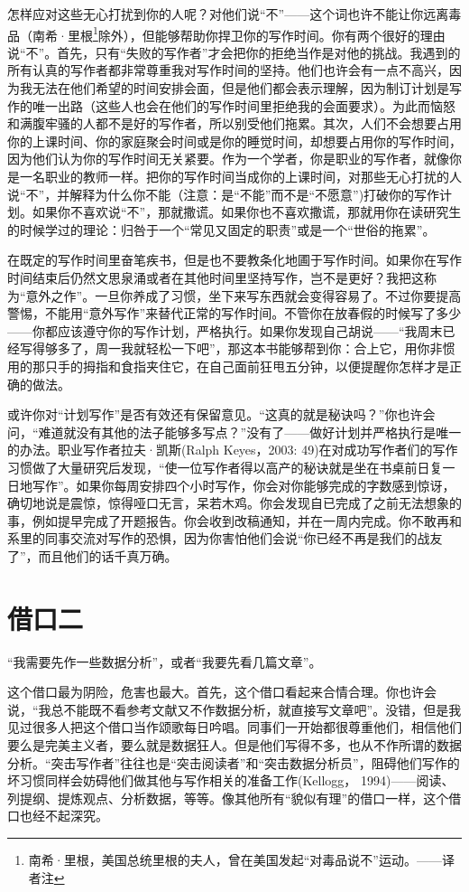 怎样应对这些无心打扰到你的人呢？对他们说“不”——这个词也许不能让你远离毒品（南希·里根\footnote{南希·里根，美国总统里根的夫人，曾在美国发起“对毒品说不”运动。——译者注}除外），但能够帮助你捍卫你的写作时间。你有两个很好的理由说“不”。首先，只有“失败的写作者”才会把你的拒绝当作是对他的挑战。我遇到的所有认真的写作者都非常尊重我对写作时间的坚持。他们也许会有一点不高兴，因为我无法在他们希望的时间安排会面，但是他们都会表示理解，因为制订计划是写作的唯一出路（这些人也会在他们的写作时间里拒绝我的会面要求）。为此而恼怒和满腹牢骚的人都不是好的写作者，所以别受他们拖累。其次，人们不会想要占用你的上课时间、你的家庭聚会时间或是你的睡觉时间，却想要占用你的写作时间，因为他们认为你的写作时间无关紧要。作为一个学者，你是职业的写作者，就像你是一名职业的教师一样。把你的写作时间当成你的上课时间，对那些无心打扰的人说“不”，并解释为什么你不能（注意：是“不能”而不是“不愿意”)打破你的写作计划。如果你不喜欢说“不”，那就撒谎。如果你也不喜欢撒谎，那就用你在读研究生的时候学过的理论：归咎于一个“常见又固定的职责”或是一个“世俗的拖累”。

在既定的写作时间里奋笔疾书，但是也不要教条化地圃于写作时间。如果你在写作时间结束后仍然文思泉涌或者在其他时间里坚持写作，岂不是更好？我把这称为“意外之作”。一旦你养成了习惯，坐下来写东西就会变得容易了。不过你要提高警惕，不能用“意外写作”来替代正常的写作时间。不管你在放春假的时候写了多少——你都应该遵守你的写作计划，严格执行。如果你发现自己胡说——“我周末已经写得够多了，周一我就轻松一下吧”，那这本书能够帮到你：合上它，用你非惯用的那只手的拇指和食指夹住它，在自己面前狂甩五分钟，以便提醒你怎样才是正确的做法。

或许你对“计划写作”是否有效还有保留意见。“这真的就是秘诀吗？”你也许会问，“难道就没有其他的法子能够多写点？”没有了——做好计划并严格执行是唯一的办法。职业写作者拉夫·凯斯(Ralph Keyes，2003: 49)在对成功写作者们的写作习惯做了大量研究后发现，“使一位写作者得以高产的秘诀就是坐在书桌前日复一日地写作”。如果你每周安排四个小时写作，你会对你能够完成的字数感到惊讶，确切地说是震惊，惊得哑口无言，呆若木鸡。你会发现自已完成了之前无法想象的事，例如提早完成了开题报告。你会收到改稿通知，并在一周内完成。你不敢再和系里的同事交流对写作的恐惧，因为你害怕他们会说“你已经不再是我们的战友了”，而且他们的话千真万确。


\section{借口二}
“我需要先作一些数据分析”，或者“我要先看几篇文章”。

这个借口最为阴险，危害也最大。首先，这个借口看起来合情合理。你也许会说，“我总不能既不看参考文献又不作数据分析，就直接写文章吧”。没错，但是我见过很多人把这个借口当作颂歌每日吟唱。同事们一开始都很尊重他们，相信他们要么是完美主义者，要么就是数据狂人。但是他们写得不多，也从不作所谓的数据分析。“突击写作者”往往也是“突击阅读者”和“突击数据分析员”，阻碍他们写作的坏习惯同样会妨碍他们做其他与写作相关的准备工作(Kellogg， 1994)——阅读、列提纲、提炼观点、分析数据，等等。像其他所有“貌似有理”的借口一样，这个借口也经不起深究。

